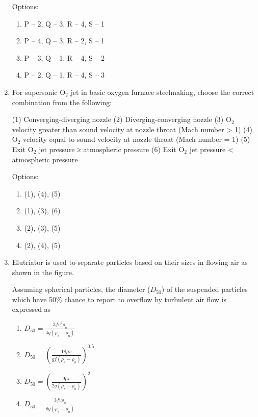 \documentclass[12pt]{article}
\begin{document}
\begin{enumerate}
Options:  
\begin{enumerate}[label=(\alph*)]
\item P – 2, Q – 3, R – 4, S – 1
\item P – 4, Q – 3, R – 2, S – 1
\item P – 3, Q – 1, R – 4, S – 2
\item P – 2, Q – 1, R – 4, S – 3
\end{enumerate}

\item For supersonic O\(_2\) jet in basic oxygen furnace steelmaking, choose the correct combination from the following:

(1) Converging-diverging nozzle  
(2) Diverging-converging nozzle  
(3) O\(_2\) velocity greater than sound velocity at nozzle throat (Mach number > 1)  
(4) O\(_2\) velocity equal to sound velocity at nozzle throat (Mach number = 1)  
(5) Exit O\(_2\) jet pressure ≥ atmospheric pressure  
(6) Exit O\(_2\) jet pressure < atmospheric pressure  

Options:  
\begin{enumerate}[label=(\alph*)]
\item (1), (4), (5)
\item (1), (3), (6)
\item (2), (3), (5)
\item (2), (4), (5)
\end{enumerate}

\item Elutriator is used to separate particles based on their sizes in flowing air as shown in the figure.

Assuming spherical particles, the diameter (\(D_{50}\)) of the suspended particles which have 50\% chance to report to overflow by turbulent air flow is expressed as

\begin{enumerate}[label=(\alph*)]
\item \(D_{50} = \frac{3 f v^2 \rho_a}{4 g (\rho_s - \rho_a)}\)
\item \(D_{50} = \left(\frac{18 \mu v}{g f (\rho_s - \rho_a)}\right)^{0.5}\)
\item \(D_{50} = \left(\frac{9 \mu v}{2 g (\rho_s - \rho_a)}\right)^2\)
\item \(D_{50} = \frac{3 f v \rho_a}{8 g (\rho_s - \rho_a)}\)
\end{enumerate}
































\end{enumerate}
\end{document}
